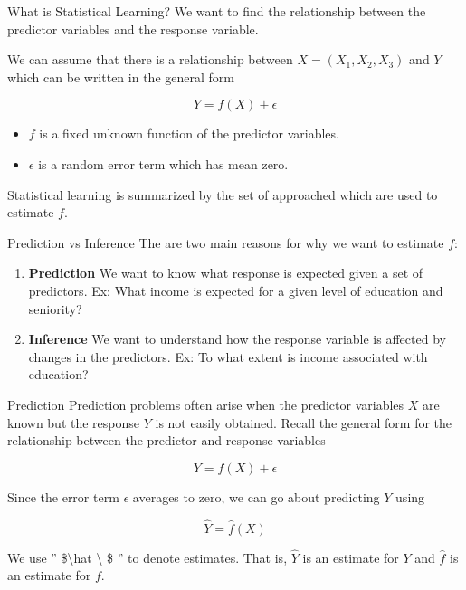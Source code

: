 \documentclass[
  ignorenonframetext,
  aspectratio=169,
]{beamer}
\begin{document}
\begin{frame}{What is Statistical Learning?}
\protect\hypertarget{what-is-statistical-learning-2}{}
We want to find the relationship between the predictor variables and the
response variable.

We can assume that there is a relationship between
\(X = (X_1, X_2, X_3)\) and \(Y\) which can be written in the general
form

\begin{block}{}
$$Y = f(X) + \epsilon$$

\begin{itemize}
    \item $f$ is a fixed unknown function of the predictor variables.
    \item $\epsilon$ is a random error term which has mean zero.
\end{itemize}
\end{block}

\alert{Statistical learning is summarized by the set of approached which are used to estimate $f$.}
\end{frame}

\begin{frame}{Prediction vs Inference}
\protect\hypertarget{prediction-vs-inference}{}
The are two main reasons for why we want to estimate \(f\):

\begin{enumerate}
\item
  \textbf{Prediction} We want to know
  \alert{what response is expected given a set of predictors}. Ex: What
  income is expected for a given level of education and seniority?
\item
  \textbf{Inference} We want to understand
  \alert{how the response variable is affected by changes in the predictors}.
  Ex: To what extent is income associated with education?
\end{enumerate}
\end{frame}

\begin{frame}{Prediction}
\protect\hypertarget{prediction}{}
Prediction problems often arise when the
\alert{predictor variables $X$ are known but the response $Y$ is not easily obtained}.
Recall the general form for the relationship between the predictor and
response variables

\[Y = f(X) + \epsilon\]

Since the error term \(\epsilon\) averages to zero, we can go about
predicting \(Y\) using

\[\hat Y = \hat f(X)\]

We use '' \$\textbackslash hat \textbackslash{} \$ '' to denote
estimates. That is, \(\hat Y\) is an estimate for \(Y\) and \(\hat f\)
is an estimate for \(f\).
\end{frame}
\end{document}
